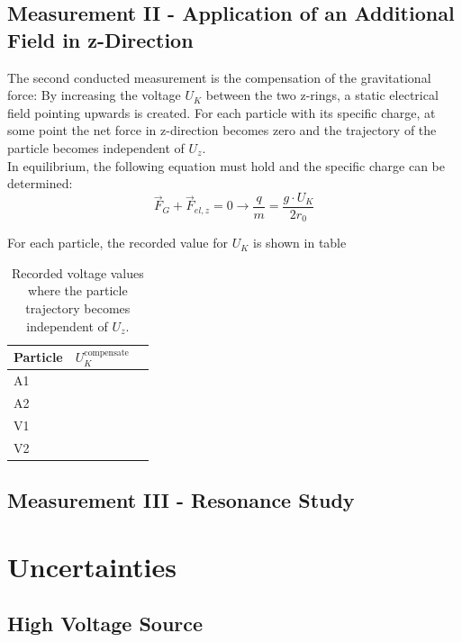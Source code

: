 \documentclass[
	paper=A4,
	parskip=full,
	chapterprefix=true,
	11pt,
	headings=normal,
	bibliography=totoc,
	listof=totoc,
	titlepage=on,
]{scrreprt}
\begin{document}
\section{Measurement II - Application of an Additional Field in z-Direction}
The second conducted measurement is the compensation of the gravitational force: By increasing the voltage $U_K$ between the two z-rings, a static electrical field pointing upwards is created. For each particle with its specific charge, at some point the net force in z-direction becomes zero and the trajectory of the particle becomes independent of $U_z$. \\
In equilibrium, the following equation must hold and the specific charge can be determined:
\begin{equation}
\vec{F}_G+\vec{F}_{el,z} = 0 \rightarrow \frac{q}{m} = \frac{g\cdot U_K}{2r_0}
\end{equation}

For each particle, the recorded value for $U_K$ is shown in table

\begin{table}[htbp]
	\centering
	\begin{tabular}{
			l
			l
			l
		}
		\toprule
		Particle & $U_K^{\textrm{compensate}}$ &  \\ 
		\midrule
		A1 & \\
		A2 & \\
		V1 & \\
		V2 & \\
		
		\bottomrule
	\end{tabular}
	\caption{Recorded voltage values where the particle trajectory becomes independent of $U_z$.}
	\label{tbl:Gcomp}
\end{table}


\section{Measurement III - Resonance Study}

\chapter{Uncertainties}
\label{ch:systematics}
\section{High Voltage Source}
\end{document}

